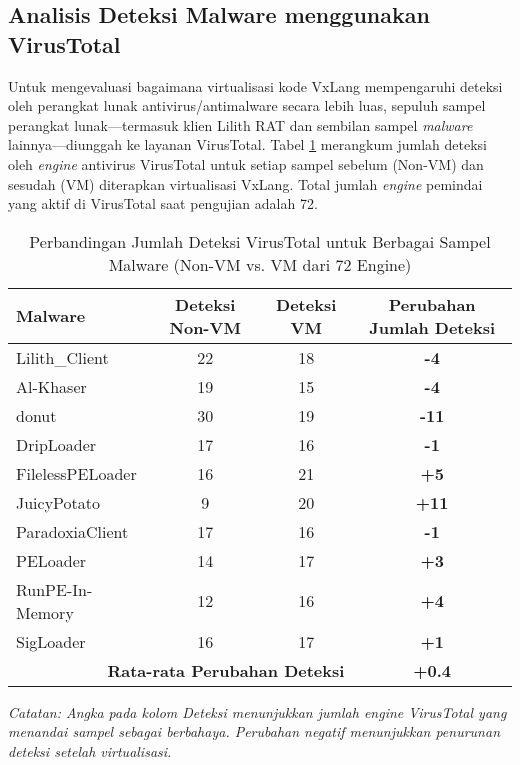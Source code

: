 \subsection{Analisis Deteksi Malware menggunakan VirusTotal}
\label{subsec:analisis_virustotal_all_malware}
Untuk mengevaluasi bagaimana virtualisasi kode VxLang mempengaruhi deteksi oleh perangkat lunak antivirus/antimalware secara lebih luas, sepuluh sampel perangkat lunak—termasuk klien Lilith RAT dan sembilan sampel \textit{malware} lainnya—diunggah ke layanan VirusTotal. Tabel \ref{tab:virustotal_all_malware_bab5} merangkum jumlah deteksi oleh \textit{engine} antivirus VirusTotal untuk setiap sampel sebelum (Non-VM) dan sesudah (VM) diterapkan virtualisasi VxLang. Total jumlah \textit{engine} pemindai yang aktif di VirusTotal saat pengujian adalah 72.

\begin{table}[H]
    \centering
    \caption{Perbandingan Jumlah Deteksi VirusTotal untuk Berbagai Sampel Malware (Non-VM vs. VM dari 72 Engine)}
    \label{tab:virustotal_all_malware_bab5}
    \begin{tabular}{@{}lccc@{}}
        \toprule
        \textbf{Malware} & \textbf{Deteksi Non-VM} & \textbf{Deteksi VM} & \textbf{Perubahan Jumlah Deteksi} \\
        \midrule
        Lilith\_Client    & 22 & 18 & \textbf{-4} \\
        Al-Khaser         & 19 & 15 & \textbf{-4} \\
        donut             & 30 & 19 & \textbf{-11} \\
        DripLoader        & 17 & 16 & \textbf{-1} \\
        FilelessPELoader  & 16 & 21 & \textbf{+5} \\
        JuicyPotato       & 9  & 20 & \textbf{+11} \\
        ParadoxiaClient   & 17 & 16 & \textbf{-1} \\
        PELoader          & 14 & 17 & \textbf{+3} \\
        RunPE-In-Memory   & 12 & 16 & \textbf{+4} \\
        SigLoader         & 16 & 17 & \textbf{+1} \\
        \midrule
        \multicolumn{3}{r}{\textbf{Rata-rata Perubahan Deteksi}} & \textbf{+0.4} \\
        \bottomrule
    \end{tabular}
    \textit{Catatan: Angka pada kolom Deteksi menunjukkan jumlah engine VirusTotal yang menandai sampel sebagai berbahaya. Perubahan negatif menunjukkan penurunan deteksi setelah virtualisasi.}
\end{table}

